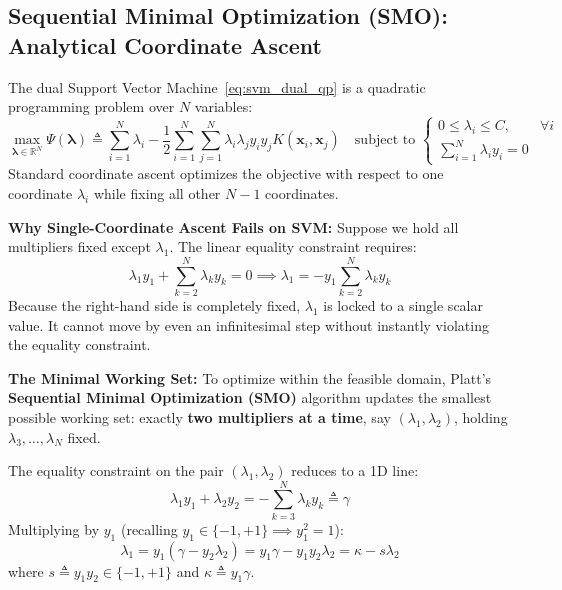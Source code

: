 \subsection{Sequential Minimal Optimization (SMO): Analytical Coordinate Ascent}
The dual Support Vector Machine~\eqref{eq:svm_dual_qp} is a quadratic programming problem over $N$ variables:
\begin{equation}
\max_{\boldsymbol{\lambda} \in \mathbb{R}^N} \Psi(\boldsymbol{\lambda}) \triangleq \sum_{i=1}^N \lambda_i - \frac{1}{2} \sum_{i=1}^N \sum_{j=1}^N \lambda_i \lambda_j y_i y_j K(\mathbf{x}_i, \mathbf{x}_j) \quad \text{subject to } \begin{cases} 0 \le \lambda_i \le C, & \forall i \\ \sum_{i=1}^N \lambda_i y_i = 0 & \end{cases}
\end{equation}
Standard coordinate ascent optimizes the objective with respect to one coordinate $\lambda_i$ while fixing all other $N - 1$ coordinates. 

\textbf{Why Single-Coordinate Ascent Fails on SVM:}
Suppose we hold all multipliers fixed except $\lambda_1$. The linear equality constraint requires:
\begin{equation}
\lambda_1 y_1 + \sum_{k=2}^N \lambda_k y_k = 0 \implies \lambda_1 = -y_1 \sum_{k=2}^N \lambda_k y_k
\end{equation}
Because the right-hand side is completely fixed, $\lambda_1$ is locked to a single scalar value. It cannot move by even an infinitesimal step without instantly violating the equality constraint.

\textbf{The Minimal Working Set:}
To optimize within the feasible domain, Platt's \textbf{Sequential Minimal Optimization (SMO)} algorithm updates the smallest possible working set: exactly \textbf{two multipliers at a time}, say $(\lambda_1, \lambda_2)$, holding $\lambda_3, \dots, \lambda_N$ fixed.

The equality constraint on the pair $(\lambda_1, \lambda_2)$ reduces to a 1D line:
\begin{equation}
\lambda_1 y_1 + \lambda_2 y_2 = -\sum_{k=3}^N \lambda_k y_k \triangleq \gamma
\end{equation}
Multiplying by $y_1$ (recalling $y_1 \in \{-1, +1\} \implies y_1^2 = 1$):
\begin{equation}
\lambda_1 = y_1(\gamma - y_2 \lambda_2) = y_1 \gamma - y_1 y_2 \lambda_2 = \kappa - s \lambda_2
\label{eq:smo_line_sub}
\end{equation}
where $s \triangleq y_1 y_2 \in \{-1, +1\}$ and $\kappa \triangleq y_1 \gamma$.

